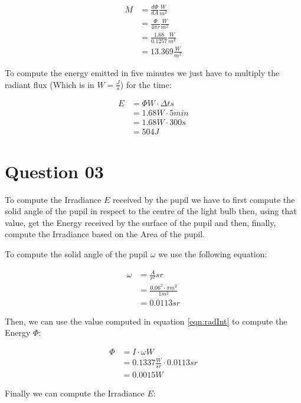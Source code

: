     \begin{align}
      M &= \frac{d\Phi}{dA}\frac{W}{m^2}    \\
        &= \frac{\Phi}{4\pi{}r}\frac{W}{m^2}\\
        &= \frac{1.68}{0.1257}\frac{W}{m^2} \\
        &= 13.369\frac{W}{m^2}
    \end{align}

    To compute the energy emitted in five minutes we just have to multiply the radiant flux (Which is in $W = \frac{J}{s}$)
    for the time:

    \begin{align}
      E &= \Phi{}W \cdot \Delta{}t s \\
        &= 1.68W \cdot 5min \\
        &= 1.68W \cdot 300s \\
        &= 504J
    \end{align}

  \section{Question 03}

    To compute the Irradiance $E$ received by the pupil we have to first compute the solid angle of the pupil in
    respect to the centre of the light bulb then, using that value, get the Energy received by the surface of the pupil
    and then, finally, compute the Irradiance based on the Area of the pupil.

    To compute the solid angle of the pupil $\omega$ we use the following equation:

    \begin{align}\label{eqn:omega}
      \omega  &= \frac{A}{r^2}sr \\
              &= \frac{0.06^2 \cdot \pi m^2}{1 m^2} \\
              &= 0.0113 sr
    \end{align}

    Then, we can use the value computed in equation \ref{eqn:radInt} to compute the Energy $\Phi$:

    \begin{align}\label{eqn:Phi}
      \Phi  &= I \cdot \omega W \\
            &= 0.1337 \frac{W}{sr} \cdot 0.0113 sr \\
            &= 0.0015 W
    \end{align}

    Finally we can compute the Irradiance $E$:

